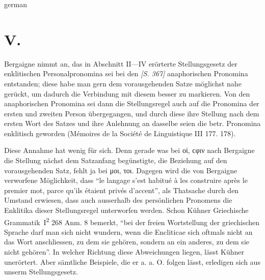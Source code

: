 \begin{otherlanguage*}{german}
\section*{V.}

Bergaigne nimmt an, das in Abschnitt II—IV erörterte Stellungsgesetz der enklitischen Personalpronomina sei bei den \hypertarget{p367}{\emph{[S. 367]}}\label{p367} anaphorischen Pronomina entstanden; diese habe man gern dem vorausgehenden Satze möglichst nahe gerückt, um dadurch die Verbindung mit diesem besser zu markieren. Von den anaphorischen Pronomina sei dann die Stellungsregel auch auf die Pronomina der ersten und zweiten Person übergegangen, und durch diese ihre Stellung nach dem ersten Wort des Satzes und ihre Anlehnung an dasselbe seien die betr. Pronomina enklitisch geworden (Mémoires de la Société de Linguistique III 177. 178).

Diese Annahme hat wenig für sich. Denn gerade was bei οἱ, ϲφιν nach Bergaigne die Stellung nächst dem Satzanfang begünstigte, die Beziehung auf den vorausgehenden Satz, fehlt ja bei μοι, τοι. Dagegen wird die von Bergaigne verworfene Möglichkeit, dass “le langage s’est habitué à les construire après le premier mot, parce qu’ils étaient privés d’accent”, als Thatsache durch den Umstand erwiesen, dass auch ausserhalb des persönlichen Pronomens die Enklitika dieser Stellungsregel unterworfen werden. Schon Kühner Griechische Grammatik~I\textsuperscript{2} 268 Anm. 8 bemerkt, “bei der freien Wortstellung der griechischen Sprache darf man sich nicht wundern, wenn die Encliticae sich oftmals nicht an das Wort anschliessen, zu dem sie gehören, sondern an ein anderes, zu dem sie nicht gehören”. In welcher Richtung diese Abweichungen liegen, lässt Kühner unerörtert. Aber sämtliche Beispiele, die er a. a. O. folgen lässt, erledigen sich aus unserm Stellungsgesetz.


\end{otherlanguage*}
